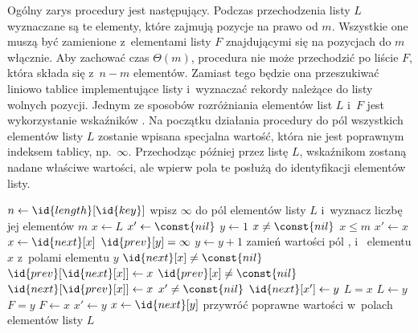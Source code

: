 \exercise %
Ogólny zarys procedury  jest następujący. Podczas przechodzenia listy $L$ wyznaczane są te elementy, które zajmują pozycje na prawo od $m$. Wszystkie one muszą być zamienione z~elementami listy $F$ znajdującymi się na pozycjach do $m$ włącznie. Aby zachować czas $\Theta(m)$, procedura nie może przechodzić po liście $F$, która składa się z~$n-m$ elementów. Zamiast tego będzie ona przeszukiwać liniowo tablice implementujące listy i~wyznaczać rekordy należące do listy wolnych pozycji. Jednym ze sposobów rozróżniania elementów list $L$ i~$F$ jest wykorzystanie wskaźników . Na początku działania procedury do pól  wszystkich elementów listy $L$ zostanie wpisana specjalna wartość, która nie jest poprawnym indeksem tablicy, np.\ $\infty$. Przechodząc później przez listę $L$, wskaźnikom  zostaną nadane właściwe wartości, ale wpierw pola te posłużą do identyfikacji elementów listy.
\begin{codebox}
\li	$n\gets\id{length}[\id{key}]$
\li	wpisz $\infty$ do pól  elementów listy $L$ i~wyznacz liczbę jej elementów $m$ \label{li:compactify-list-preprocess}
\li $x\gets L$
\li	$x'\gets\const{nil}$
\li	$y\gets1$
\li	\While $x\ne\const{nil}$ \label{li:compactify-list-while-begin}
\li		\Do
			\If $x\le m$
\li				\Then
					$x'\gets x$
\li					$x\gets\id{next}[x]$
\li				\Else
					\While $\id{prev}[y]=\infty$ \label{li:compactify-list-while2-begin}
\li						\Do $y\gets y+1$
						\End \label{li:compactify-list-while2-end}
\li					zamień wartości pól ,  i~ elementu $x$ z~polami elementu $y$ \label{li:compactify-list-swap}
\li					\If $\id{next}[x]\ne\const{nil}$ \label{li:compactify-list-fix-neighbors-begin}
\li						\Then $\id{prev}[\id{next}[x]]\gets x$
						\End
\li					\If $\id{prev}[x]\ne\const{nil}$
\li						\Then $\id{next}[\id{prev}[x]]\gets x$
						\End \label{li:compactify-list-fix-neighbors-end}
\li					\If $x'\ne\const{nil}$ \label{li:compactify-list-fix-predecessor-begin}
\li						\Then $\id{next}[x']\gets y$
						\End \label{li:compactify-list-fix-predecessor-end}
\li					\If $L=x$ \label{li:compactify-list-fix-heads-begin}
\li						\Then $L\gets y$
						\End
\li					\If $F=y$
\li						\Then $F\gets x$
						\End \label{li:compactify-list-fix-heads-end}
\li					$x'\gets y$
\li					$x\gets\id{next}[y]$
				\End
		\End \label{li:compactify-list-while-end}
\li	przywróć poprawne wartości w~polach  elementów listy $L$ \label{li:compactify-list-postprocess}
\end{codebox}

